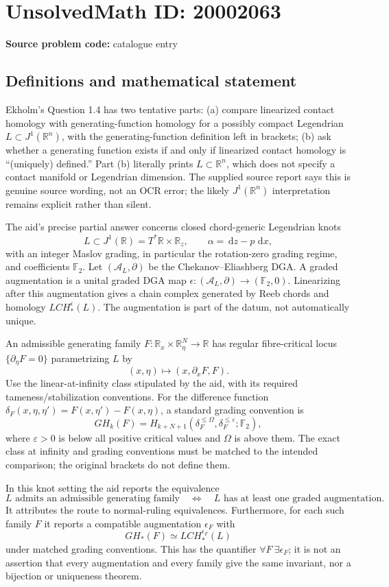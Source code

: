 \documentclass[11pt]{article}
\newcommand{\R}{\mathbb{R}}
\newcommand{\F}{\mathbb{F}}
\newcommand{\dd}{\,\mathrm{d}}
\begin{document}
\section*{UnsolvedMath ID: 20002063}
\textbf{Source problem code:} catalogue entry
\subsection{Definitions and mathematical statement}
Ekholm's Question 1.4 has two tentative parts: (a) compare linearized contact homology with generating-function homology for a possibly compact Legendrian \(L\subset J^1(\R^n)\), with the generating-function definition left in brackets; (b) ask whether a generating function exists if and only if linearized contact homology is ``(uniquely) defined.'' Part (b) literally prints \(L\subset\R^n\), which does not specify a contact manifold or Legendrian dimension. The supplied source report says this is genuine source wording, not an OCR error; the likely \(J^1(\R^n)\) interpretation remains explicit rather than silent.

The aid's precise partial answer concerns closed chord-generic Legendrian knots
\[
 L\subset J^1(\R)=T^*\R\times\R_z,
 \qquad\alpha=\dd z-p\,\dd x,
\]
with an integer Maslov grading, in particular the rotation-zero grading regime, and coefficients \(\F_2\). Let \((\mathcal A_L,\partial)\) be the Chekanov--Eliashberg DGA. A graded augmentation is a unital graded DGA map
\(\epsilon:(\mathcal A_L,\partial)\to(\F_2,0)\).
Linearizing after this augmentation gives a chain complex generated by Reeb chords and homology \(LCH_*^\epsilon(L)\). The augmentation is part of the datum, not automatically unique.

An admissible generating family \(F:\R_x\times\R_\eta^N\to\R\) has regular fibre-critical locus \(\{\partial_\eta F=0\}\) parametrizing \(L\) by
\[
 (x,\eta)\longmapsto(x,\partial_xF,F).
\]
Use the linear-at-infinity class stipulated by the aid, with its required tameness/stabilization conventions. For the difference function
\(\delta_F(x,\eta,\eta')=F(x,\eta')-F(x,\eta)\), a standard grading convention is
\[
 GH_k(F)=H_{k+N+1}(\delta_F^{\leq\Omega},
                         \delta_F^{\leq\varepsilon};\F_2),
\]
where \(\varepsilon>0\) is below all positive critical values and \(\Omega\) is above them. The exact class at infinity and grading conventions must be matched to the intended comparison; the original brackets do not define them.

In this knot setting the aid reports the equivalence
\[
 L\text{ admits an admissible generating family}
 \quad\Longleftrightarrow\quad
 L\text{ has at least one graded augmentation}.
\]
It attributes the route to normal-ruling equivalences. Furthermore, for each such family \(F\) it reports a compatible augmentation \(\epsilon_F\) with
\[
 GH_*(F)\simeq LCH_*^{\epsilon_F}(L)
\]
under matched grading conventions. This has the quantifier \(\forall F\ \exists\epsilon_F\); it is not an assertion that every augmentation and every family give the same invariant, nor a bijection or uniqueness theorem.
\end{document}
